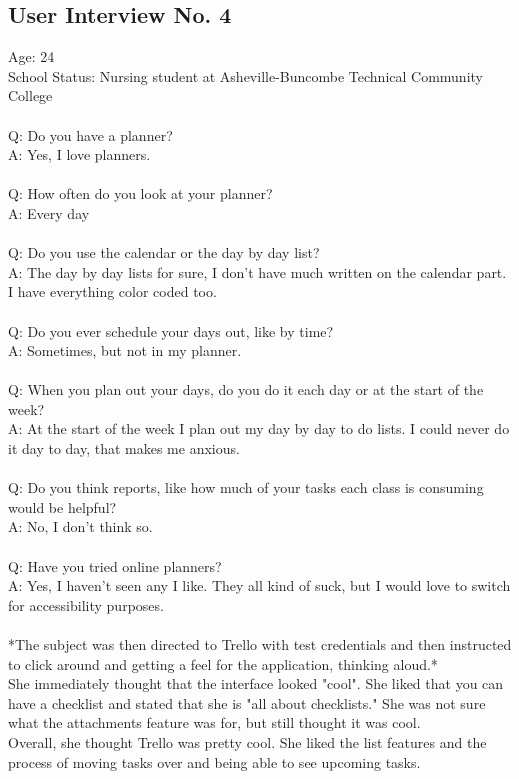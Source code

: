 \subsection{User Interview No. 4}
Age: 24\\
School Status: Nursing student at Asheville-Buncombe Technical Community College\\
\\
Q: Do you have a planner?\\
A: Yes, I love planners. \\ \\
Q: How often do you look at your planner?\\
A: Every day\\ \\
Q: Do you use the calendar or the day by day list?\\
A: The day by day lists for sure, I don’t have much written on the calendar part. I have everything color coded too.\\ \\
Q: Do you ever schedule your days out, like by time?\\
A: Sometimes, but not in my planner.\\ \\
Q: When you plan out your days, do you do it each day or at the start of the week?\\
A: At the start of the week I plan out my day by day to do lists. I could never do it day to day, that makes me anxious.\\ \\
Q: Do you think reports, like how much of your tasks each class is consuming would be helpful?\\
A: No, I don’t think so.\\ \\
Q: Have you tried online planners?\\
A: Yes, I haven’t seen any I like. They all kind of suck, but I would love to switch for accessibility purposes.\\ \\

*The subject was then directed to Trello with test credentials and then instructed to click around and getting a feel for the application, thinking aloud.*\\

She immediately thought that the interface looked "cool". She liked that you can have a checklist and stated that she is "all about checklists." She was not sure what the attachments feature was for, but still thought it was cool.\\
Overall, she thought Trello was pretty cool. She liked the list features and the process of moving tasks over and being able to see upcoming tasks.

